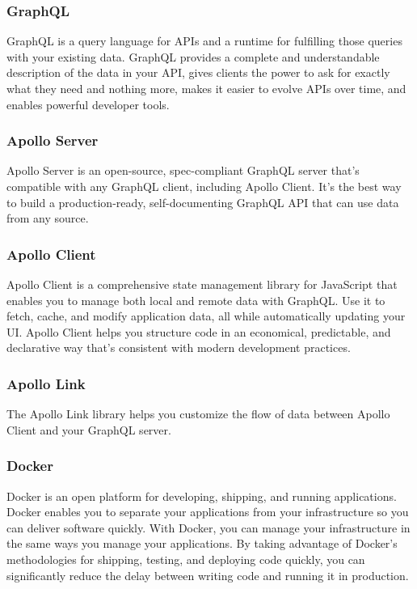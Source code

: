     \subsubsection{GraphQL}
    GraphQL is a query language for APIs and a runtime for fulfilling those queries with your existing data. 
    GraphQL provides a complete and understandable description of the data in your API, gives clients the power to ask for exactly what they need and nothing more, 
    makes it easier to evolve APIs over time, and enables powerful developer tools.

    \subsubsection{Apollo Server}
    Apollo Server is an open-source, spec-compliant GraphQL server that's compatible with any GraphQL client, including Apollo Client. 
    It's the best way to build a production-ready, self-documenting GraphQL API that can use data from any source.

    \subsubsection{Apollo Client}
    Apollo Client is a comprehensive state management library for JavaScript that enables you to manage both local and remote data with GraphQL.
    Use it to fetch, cache, and modify application data, all while automatically updating your UI.
    Apollo Client helps you structure code in an economical, predictable, and declarative way that's consistent with modern development practices. 

    \subsubsection{Apollo Link}
    The Apollo Link library helps you customize the flow of data between Apollo Client and your GraphQL server.

    \subsubsection{Docker}
    Docker is an open platform for developing, shipping, and running applications. 
    Docker enables you to separate your applications from your infrastructure so you can deliver software quickly. 
    With Docker, you can manage your infrastructure in the same ways you manage your applications. 
    By taking advantage of Docker’s methodologies for shipping, testing, and deploying code quickly, 
    you can significantly reduce the delay between writing code and running it in production.

